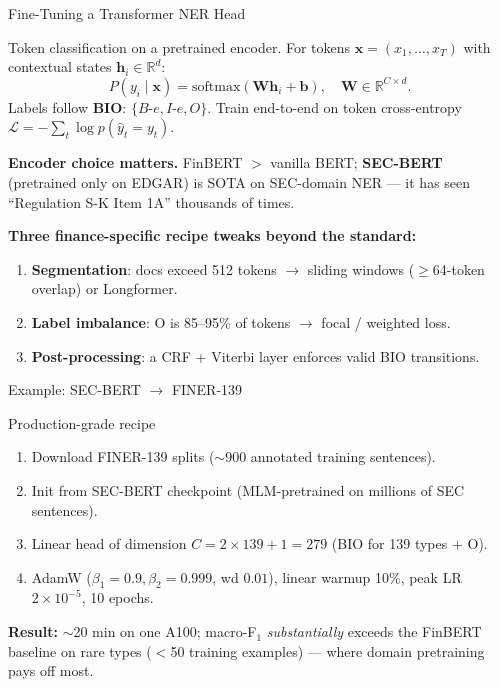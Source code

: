 \documentclass[9pt,t]{beamer}
\begin{document}
\begin{frame}{Fine-Tuning a Transformer NER Head}
\begin{underhood}
Token classification on a pretrained encoder. For tokens
$\mathbf{x}=(x_1,\dots,x_T)$ with contextual states $\mathbf{h}_i \in \mathbb{R}^d$:
\[
P(y_i \mid \mathbf{x}) = \mathrm{softmax}(\mathbf{W}\mathbf{h}_i + \mathbf{b}),
\quad \mathbf{W}\in\mathbb{R}^{C\times d}.
\]
Labels follow \textbf{BIO}: $\{B\text{-}e, I\text{-}e, O\}$. Train end-to-end on
token cross-entropy $\mathcal{L}=-\sum_t \log p(\hat y_t = y_t)$.
\end{underhood}

\medskip
\textbf{Encoder choice matters.} FinBERT $>$ vanilla BERT; \textbf{SEC-BERT}
(pretrained only on EDGAR) is SOTA on SEC-domain NER --- it has seen
``Regulation S-K Item 1A'' thousands of times.

\medskip
\textbf{Three finance-specific recipe tweaks beyond the standard:}
\begin{enumerate}
  \item \textbf{Segmentation}: docs exceed 512 tokens $\to$ sliding windows
        ($\geq$64-token overlap) or Longformer.
  \item \textbf{Label imbalance}: O is 85--95\% of tokens $\to$ focal / weighted loss.
  \item \textbf{Post-processing}: a CRF + Viterbi layer enforces valid BIO transitions.
\end{enumerate}
\end{frame}

\begin{frame}{Example: SEC-BERT $\to$ FINER-139}
\begin{exampleblock}{Production-grade recipe}
\begin{enumerate}
  \item Download FINER-139 splits ($\sim$900 annotated training sentences).
  \item Init from SEC-BERT checkpoint (MLM-pretrained on millions of SEC sentences).
  \item Linear head of dimension $C = 2\times 139 + 1 = 279$ (BIO for 139 types $+$ O).
  \item AdamW ($\beta_1{=}0.9,\beta_2{=}0.999$, wd $0.01$), linear warmup 10\%,
        peak LR $2\times10^{-5}$, 10 epochs.
\end{enumerate}
\end{exampleblock}

\medskip
\textbf{Result:} $\sim$20 min on one A100; macro-F$_1$ \emph{substantially} exceeds
the FinBERT baseline on rare types ($<$50 training examples) --- where domain
pretraining pays off most.
\end{frame}
\end{document}
